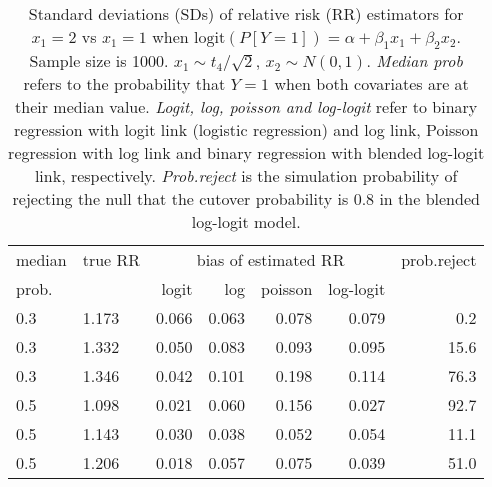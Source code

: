 \documentclass[12pt,a4paper]{article}
\begin{document}
\begin{table}[H] 
\small\sf\centering 
\caption{Standard deviations (SDs) of relative risk (RR) estimators for $x_1=2$ vs $x_1=1$ when $\mbox{logit}(P[Y=1])=\alpha+\beta_1 x_1 + \beta_2 x_2$. Sample size is 1000. $x_1 \sim $$t_4/\sqrt{2}$, $x_2 \sim N(0,1)$. {\it Median prob} refers to the probability that $Y=1$ when both covariates are at their median value. {\it Logit, log, poisson and log-logit} refer to binary regression with logit link (logistic regression) and log link, Poisson regression with log link and binary regression with blended log-logit link, respectively. {\it Prob.reject} is the simulation probability of rejecting the null that the cutover probability is $0.8$ in the blended log-logit model.} 
\begin{tabular}{llrrrrr} 
\toprule 
median & true RR & \multicolumn{4}{c}{bias of estimated RR} & prob.reject \\ 
prob. & & logit & log & poisson & log-logit  & \\ \midrule 
0.3 & 1.173 & 0.066 & 0.063 & 0.078 & 0.079 &  0.2 \\  
0.3 & 1.332 & 0.050 & 0.083 & 0.093 & 0.095 & 15.6 \\  
0.3 & 1.346 & 0.042 & 0.101 & 0.198 & 0.114 & 76.3 \\  
0.5 & 1.098 & 0.021 & 0.060 & 0.156 & 0.027 & 92.7 \\  
0.5 & 1.143 & 0.030 & 0.038 & 0.052 & 0.054 & 11.1 \\  
0.5 & 1.206 & 0.018 & 0.057 & 0.075 & 0.039 & 51.0 \\  
\bottomrule 
\end{tabular} 
\end{table} 
\end{document}
